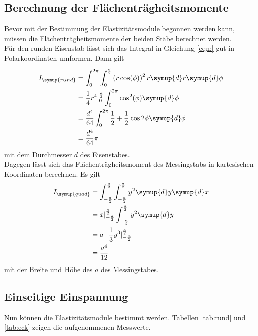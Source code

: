 \subsection{Berechnung der Flächenträgheitsmomente}
  Bevor mit der Bestimmung der Elastizitätsmodule begonnen werden kann, müssen die Flächenträgheitsmomente der beiden 
  Stäbe berechnet werden.\\
  Für den runden Eisenstab lässt sich das Integral in Gleichung \eqref{eqn:} gut in Polarkoordinaten 
  umformen. Dann gilt
  \begin{align*}
    I_{\symup{rund}} &= \int_0^{2 \pi} \int_0^{\frac{d}{2}} \left( r \cos(\phi)\right)^2 r \symup{d}r \symup{d}\phi \\
    &= \frac{1}{4} r^4|_{0}^{ \frac{d}{2} } \int_0^{2 \pi} \cos^2(\phi) \symup{d}\phi \\
    &= \frac{d^4}{64} \int_{0}^{2 \pi} \frac{1}{2} + \frac{1}{2} \cos{2 \phi} \symup{d}\phi\\
    &= \frac{d^4}{64} \pi 
  \end{align*}
  mit dem Durchmesser $d$ des Eisenstabes.\\

  \noindent Dagegen lässt sich das Flächenträgheitsmoment des Messingstabs in kartesischen Koordinaten berechnen. Es gilt
  \begin{align*}
    I_{\symup{quad}} &= \int_{- \frac{a}{2}}^{ \frac{a}{2} } \int_{ - \frac{a}{2}}^{ \frac{a}{2}} y^2 \symup{d}y \symup{d}x \\
    &= x|_{ - \frac{a}{2}}^{ \frac{a}{2}} \int_{ - \frac{a}{2}}^{ \frac{a}{2}} y^2 \symup{d}y\\
    &= a \cdot \frac{1}{3} y^3|_{ - \frac{a}{2}}^{ \frac{a}{2}}\\
    &= \frac{a^4}{12}
  \end{align*}
  mit der Breite und Höhe des $a$ des Messingstabes.

\subsection{Einseitige Einspannung}
  Nun können die Elastizitätsmodule bestimmt werden. Tabellen \ref{tab:rund} und \ref{tab:eck} 
  zeigen die aufgenommenen Messwerte.\\

